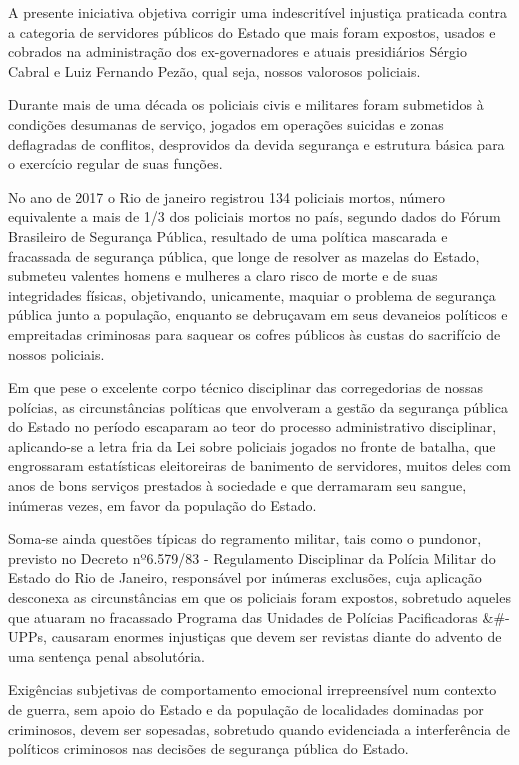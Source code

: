 \documentclass[10pt]{article}
\begin{document}
  A presente iniciativa objetiva corrigir uma indescritível injustiça praticada contra a categoria de servidores públicos do Estado que mais foram expostos, usados e cobrados na administração dos ex-governadores e atuais presidiários Sérgio Cabral e Luiz Fernando Pezão, qual seja, nossos valorosos policiais.

Durante mais de uma década os policiais civis e militares foram submetidos à condições desumanas de serviço, jogados em operações suicidas e zonas deflagradas de conflitos, desprovidos da devida segurança e estrutura básica para o exercício regular de suas funções.

No ano de 2017 o Rio de janeiro registrou 134 policiais mortos, número equivalente a mais de 1/3 dos policiais mortos no país, segundo dados do Fórum Brasileiro de Segurança Pública, resultado de uma política mascarada e fracassada de segurança pública, que longe de resolver as mazelas do Estado, submeteu valentes homens e mulheres a claro risco de morte e de suas integridades físicas, objetivando, unicamente, maquiar o problema de segurança pública junto a população, enquanto se debruçavam em seus devaneios políticos e empreitadas criminosas para saquear os cofres públicos às custas do sacrifício de nossos policiais.

Em que pese o excelente corpo técnico disciplinar das corregedorias de nossas polícias, as circunstâncias políticas que envolveram a gestão da segurança pública do Estado no período escaparam ao teor do processo administrativo disciplinar, aplicando-se a letra fria da Lei sobre  policiais jogados no fronte de batalha, que engrossaram estatísticas eleitoreiras de banimento de servidores, muitos deles com anos de bons serviços prestados à sociedade e que derramaram seu sangue, inúmeras vezes, em favor da população do Estado.

Soma-se ainda questões típicas do regramento militar, tais como o pundonor, previsto no Decreto nº6.579/83 - Regulamento Disciplinar da Polícia Militar do Estado do Rio de Janeiro, responsável por inúmeras exclusões, cuja aplicação desconexa as circunstâncias em que os policiais foram expostos, sobretudo aqueles que atuaram no fracassado Programa das Unidades de Polícias Pacificadoras &#- UPPs, causaram enormes injustiças que devem ser revistas diante do advento de uma sentença penal absolutória. 

Exigências subjetivas de comportamento emocional irrepreensível num contexto de guerra, sem apoio do Estado e da população de localidades dominadas por criminosos, devem ser sopesadas, sobretudo quando evidenciada a interferência de políticos criminosos nas decisões de segurança pública do Estado.
\end{document}
